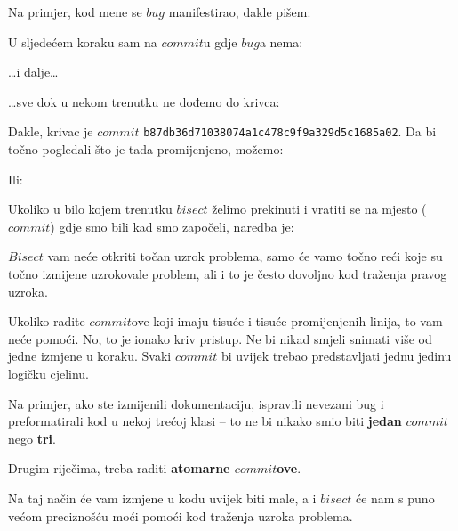 Na primjer, kod mene se $bug$ manifestirao, dakle pišem:



U sljedećem koraku sam na $commit$u gdje $bug$a nema:



\dots{}i dalje\dots



\dots{}sve dok u nekom trenutku ne dođemo do krivca:



Dakle, krivac je $commit$ \verb+b87db36d71038074a1c478c9f9a329d5c1685a02+.
Da bi točno pogledali što je tada promijenjeno, možemo:


Ili:


Ukoliko u bilo kojem trenutku $bisect$ želimo prekinuti i vratiti se na mjesto ($commit$) gdje smo bili kad smo započeli, naredba je:



$Bisect$ vam neće otkriti točan uzrok problema, samo će vamo točno reći koje su točno izmijene uzrokovale problem, ali i to je često dovoljno kod traženja pravog uzroka. 

Ukoliko radite $commit$ove koji imaju tisuće i tisuće promijenjenih linija, to vam neće pomoći.
No, to je ionako kriv pristup.
Ne bi nikad smjeli snimati više od jedne izmjene u koraku.
Svaki $commit$ bi uvijek trebao predstavljati jednu jedinu logičku cjelinu.

Na primjer, ako ste izmijenili dokumentaciju, ispravili nevezani bug i preformatirali kod u nekoj trećoj klasi -- to ne bi nikako smio biti \textbf{jedan} $commit$ nego \textbf{tri}.

Drugim riječima, treba raditi \textbf{atomarne $commit$ove}.

Na taj način će vam izmjene u kodu uvijek biti male, a i $bisect$ će nam s puno većom preciznošću moći pomoći kod traženja uzroka problema.
